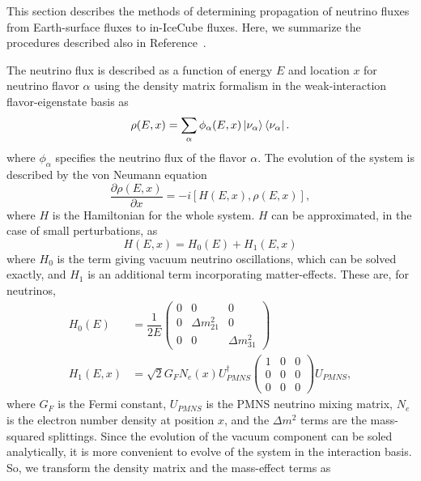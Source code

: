 \documentclass[main.tex]{subfiles}
\begin{document}
This section  describes the methods of determining propagation of neutrino fluxes from Earth-surface fluxes to in-IceCube fluxes. 
Here, we summarize the procedures described also in Reference~\cite{arguelles2021nusquids}.

The neutrino flux is described as a function of energy $E$ and location $x$ for neutrino flavor $\alpha$ using the density matrix formalism in the weak-interaction flavor-eigenstate basis as 
\begin{equation}
    \rho(E,x) = \sum_{\alpha} \phi_{\alpha}(E,x) \left| \nu_{\alpha} \right >\left< \nu_{\alpha} \right |.
\end{equation}
where $\phi_{\alpha}$ specifies the neutrino flux of the flavor $\alpha$. 
The evolution of the system is described by the von Neumann equation
\begin{equation}\label{eq:evol}
    \dfrac{\partial\rho (E,x)}{\partial x} = -i\left[ H(E,x), \rho(E,x)\right],
\end{equation}
where $H$ is the Hamiltonian for the whole system. 
$H$ can be approximated, in the case of small perturbations, as
\begin{equation}
    H(E,x) = H_{0}(E) + H_{1}(E,x)
\end{equation}
where $H_{0}$ is the term giving vacuum neutrino oscillations, which can be solved exactly, and $H_{1}$ is an additional term incorporating matter-effects.
These are, for neutrinos,
\begin{align}
    H_{0}(E) &= \dfrac{1}{2E} \left(\begin{array}{ccc} 0 & 0 & 0\\ 0 & \Delta m_{21}^{2} & 0 \\ 0 & 0 & \Delta m_{31}^{2}\end{array}\right)  \\
    H_{1}(E,x) &= \sqrt{2}G_{F} N_{e}(x) U_{PMNS}^{\dag} \left(\begin{array}{ccc}1&0&0 \\ 0 &0 & 0 \\ 0 & 0 & 0 \end{array}\right) U_{PMNS},
\end{align}
where $G_{F}$ is the Fermi constant, $U_{PMNS}$ is the PMNS neutrino mixing matrix, $N_{e}$ is the electron number density at position $x$, and the $\Delta m^{2}$ terms are the mass-squared splittings.  
Since the evolution of the vacuum component can be soled analytically, it is more convenient to evolve of the system in the interaction basis. 
So, we transform the density matrix and the mass-effect terms as 
\end{document}

